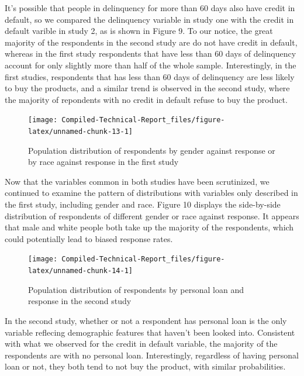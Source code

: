\documentclass[]{article}
\begin{document}
It's possible that people in delinquency for more than 60 days also have
credit in default, so we compared the delinquency variable in study one
with the credit in default varible in study 2, as is shown in Figure 9.
To our notice, the great majority of the respondents in the second study
are do not have credit in default, whereas in the first study
respondents that have less than 60 days of delinquency account for only
slightly more than half of the whole sample. Interestingly, in the first
studies, respondents that has less than 60 days of delinquency are less
likely to buy the products, and a similar trend is observed in the
second study, where the majority of repondents with no credit in default
refuse to buy the product.

\begin{figure}

{\centering \texttt{[image: Compiled-Technical-Report\_files/figure-latex/unnamed-chunk-13-1]} 

}

\caption{Population distribution of respondents by gender against response or by race against response in the first study}\label{fig:unnamed-chunk-13}
\end{figure}

Now that the variables common in both studies have been scrutinized, we
continued to examine the pattern of distributions with variables only
described in the first study, including gender and race. Figure 10
displays the side-by-side distribution of respondents of different
gender or race against response. It appears that male and white people
both take up the majority of the respondents, which could potentially
lead to biased response rates.

\begin{figure}

{\centering \texttt{[image: Compiled-Technical-Report\_files/figure-latex/unnamed-chunk-14-1]} 

}

\caption{Population distribution of respondents by personal loan and response in the second study}\label{fig:unnamed-chunk-14}
\end{figure}

In the second study, whether or not a respondent has personal loan is
the only variable reflecing demographic features that haven't been
looked into. Consistent with what we observed for the credit in default
variable, the majority of the respondents are with no personal loan.
Interestingly, regardless of having personal loan or not, they both tend
to not buy the product, with similar probabilities.
\end{document}
